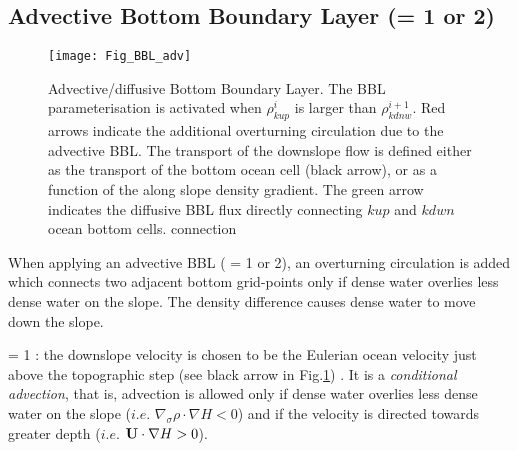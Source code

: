 \documentclass[NEMO_book]{subfiles}
\begin{document}
\subsection   {Advective Bottom Boundary Layer  (= 1 or 2)}
\label{TRA_bbl_adv}


\begin{figure}[!t] 	\begin{center}
\texttt{[image: Fig\_BBL\_adv]}
\caption{ 	\label{Fig_bbl}  
Advective/diffusive Bottom Boundary Layer. The BBL parameterisation is 
activated when $\rho^i_{kup}$ is larger than $\rho^{i+1}_{kdnw}$. 
Red arrows indicate the additional overturning circulation due to the advective BBL. 
The transport of the downslope flow is defined either as the transport of the bottom 
ocean cell (black arrow), or as a function of the along slope density gradient. 
The green arrow indicates the diffusive BBL flux directly connecting $kup$ and $kdwn$
ocean bottom cells.
connection}
\end{center}   \end{figure}




When applying an advective BBL ( = 1 or 2), an overturning 
circulation is added which connects two adjacent bottom grid-points only if dense 
water overlies less dense water on the slope. The density difference causes dense 
water to move down the slope. 

 = 1 : the downslope velocity is chosen to be the Eulerian
ocean velocity just above the topographic step (see black arrow in Fig.\ref{Fig_bbl}) 
\citep{Beckmann_Doscher1997}. It is a \textit{conditional advection}, that is, advection
is allowed only if dense water overlies less dense water on the slope ($i.e.$ 
$\nabla_\sigma \rho  \cdot  \nabla H<0$) and if the velocity is directed towards 
greater depth ($i.e.$ $\mathbf{U}  \cdot  \nabla H>0$).
\end{document}
